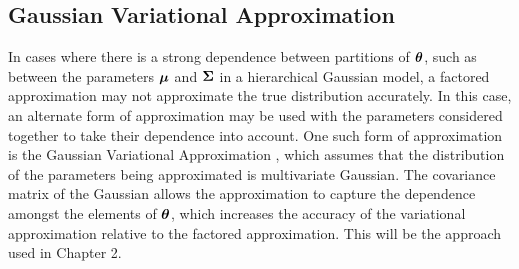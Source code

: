 





\subsection{Gaussian Variational Approximation}

In cases where there is a strong dependence between partitions of ${\boldsymbol \theta}$,
such as between the parameters ${\boldsymbol \mu}$ and ${\boldsymbol \Sigma}$ in a hierarchical Gaussian
model, a factored approximation may not approximate the true distribution
accurately. In this case, an alternate form of approximation may be used with
the parameters considered together to take their dependence into account. One
such form of approximation is the Gaussian Variational Approximation
\cite{Ormerod2012}, which assumes that the distribution of the parameters being
approximated is multivariate Gaussian. The covariance matrix of the Gaussian
allows the approximation to capture the dependence amongst the elements of
${\boldsymbol \theta}$, which increases the accuracy of the variational approximation
relative to the factored approximation. This will be the approach used in
Chapter 2.


